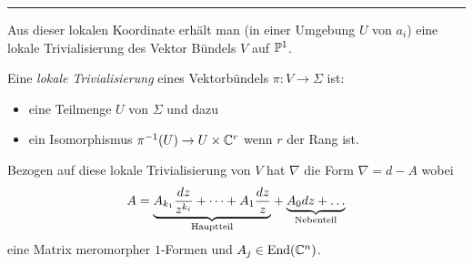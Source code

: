 \begin{center} \rule{0.7\textwidth}{0.4pt} \end{center}

Aus dieser lokalen Koordinate erhält man (in einer Umgebung $U$ von $a_i$) eine
lokale Trivialisierung des Vektor Bündels $V$ auf $\P^1$.
\begin{defn}
Eine \emph{lokale Trivialisierung} eines Vektorbündels $\pi:V\to\Sigma$ ist:
\begin{itemize}
\item eine Teilmenge $U$ von $\Sigma$ und dazu
\item ein Isomorphismus $\pi^{-1}(U)\to U\times\C^r$ wenn $r$ der Rang ist.
\end{itemize}
\end{defn}
\begin{comment}
Wähle an einem Punkt und setze von dort aus fort?!?
\end{comment}
Bezogen auf diese lokale Trivialisierung von $V$ hat $\nabla$ die Form
$\nabla=d-A$ wobei
\[
A=\underset{\text{Hauptteil}}{\underbrace{%
    A_{k_1}\frac{dz}{z^{k_i}} +\cdots+ A_{1}\frac{dz}{z}
  }} +
  \underset{\text{Nebenteil}}{\underbrace{A_0dz +\dots}}
\]
eine Matrix meromorpher $1$-Formen und $A_j\in\End(\C^n)$.
\begin{comment}
\begin{defn}
Eine meromorphe $1$-Form ist ein Element $\omega\in\Omega^1(V;\C)$ welche sich
als $\omega=udz$ mit meromorphen $u$ schreiben lässt.
\end{defn}
\end{comment}
\TODO{}

